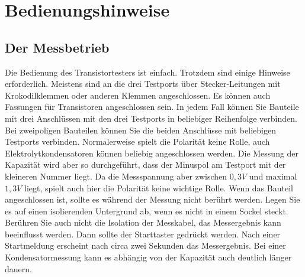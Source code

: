 \chapter{Bedienungshinweise}
\label{sec:manual}
\section{Der Messbetrieb}
Die Bedienung des Transistortesters ist einfach.
Trotzdem sind einige Hinweise erforderlich.
Meistens sind an die drei Testports über Stecker-Leitungen mit Krokodilklemmen oder anderen Klemmen angeschlossen.
Es können auch Fassungen für Transistoren angeschlossen sein.
In jedem Fall können Sie Bauteile mit drei Anschlüssen mit den drei Testports in beliebiger Reihenfolge verbinden.
Bei zweipoligen Bauteilen können Sie die beiden Anschlüsse mit beliebigen Testports verbinden.
Normalerweise spielt die Polarität keine Rolle, auch Elektrolytkondensatoren können beliebig angeschlossen werden.
Die Messung der Kapazität wird aber so durchgeführt, dass der Minuspol am Testport mit der kleineren Nummer liegt.
Da die Messspannung aber zwischen \(0,3V\) und maximal \(1,3V\) liegt, spielt auch hier die Polarität keine wichtige Rolle.
Wenn das Bauteil angeschlossen ist, sollte es während der Messung nicht berührt werden. Legen Sie es auf einen
isolierenden Untergrund ab, wenn es nicht in einem Sockel steckt. Berühren Sie auch nicht die Isolation der Messkabel,
das Messergebnis kann beeinflusst werden.
Dann sollte der Starttaster gedrückt werden.
Nach einer Startmeldung erscheint nach circa zwei Sekunden das Messergebnis. Bei einer Kondensatormessung kann es
abhängig von der Kapazität auch deutlich länger dauern.

